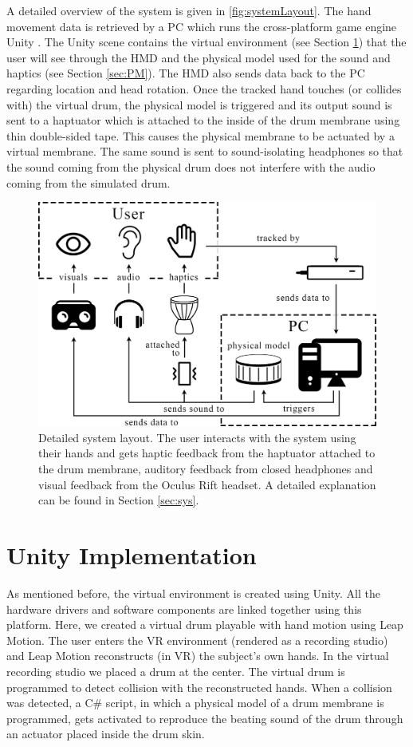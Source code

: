 \documentclass{article}
\begin{document}
A detailed overview of the system is given in \autoref{fig:systemLayout}. The hand movement data is retrieved by a PC which runs the cross-platform game engine Unity \cite{unity}. The Unity scene contains the virtual environment (see Section \ref{sec:unity}) that the user will see through the HMD and the physical model used for the sound and haptics (see Section \ref{sec:PM}). The HMD also sends data back to the PC regarding location and head rotation. Once the tracked hand touches (or collides with) the virtual drum, the physical model is triggered and its output sound is sent to a haptuator which is attached to the inside of the drum membrane using thin double-sided tape. This causes the physical membrane to be actuated by a virtual membrane. The same sound is sent to sound-isolating headphones so that the sound coming from the physical drum does not interfere with the audio coming from the simulated drum.
\begin{figure}[h]
\includegraphics[width=1.0\columnwidth]{Images/systemlayout-updated.png}
\caption{Detailed system layout. The user interacts with the system using their hands and gets haptic feedback from the haptuator attached to the drum membrane, auditory feedback from closed headphones and visual feedback from the Oculus Rift headset. A detailed explanation can be found in Section \ref{sec:sys}.}
\centering
\label{fig:systemLayout}
\end{figure}
\section{Unity Implementation}\label{sec:unity}
As mentioned before, the virtual environment is  created using Unity. All the hardware drivers and software components are linked together using this platform. Here, we created a virtual drum playable with hand motion using Leap Motion. The user enters the VR environment (rendered as a recording studio) and Leap Motion reconstructs (in VR) the subject's own hands. In the virtual recording studio we placed a drum at the center. The virtual drum is programmed to detect collision with the reconstructed hands. When a collision was detected, a C\# script, in which a physical model of a drum membrane is programmed, gets activated to reproduce the beating sound of the drum through an actuator placed inside the drum skin.
\end{document}
